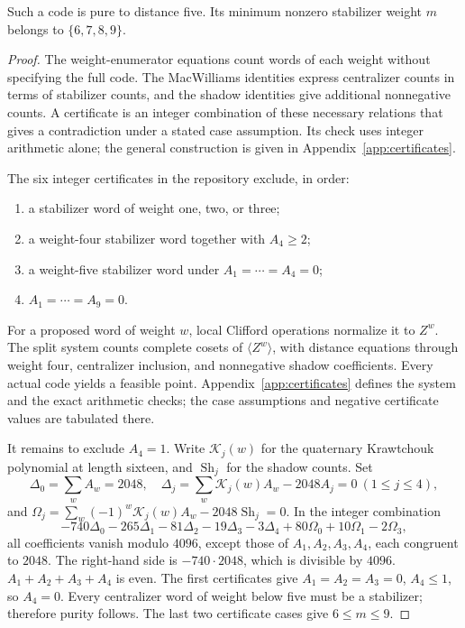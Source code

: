 \begin{proposition}\label{prop:16-reduction}
Such a code is pure to distance five. Its minimum nonzero stabilizer
weight \(m\) belongs to \(\{6,7,8,9\}\).
\end{proposition}
\begin{proof}
The weight-enumerator equations count words of each weight without
specifying the full code. The MacWilliams identities express centralizer
counts in terms of stabilizer counts, and the shadow identities give
additional nonnegative counts. A certificate is an integer combination
of these necessary relations that gives a contradiction under a stated
case assumption. Its check uses integer arithmetic alone; the general
construction is given in Appendix~\ref{app:certificates}.

The six integer certificates in the repository exclude, in order:
\begin{enumerate}[label=(\alph*)]
\item a stabilizer word of weight one, two, or three;
\item a weight-four stabilizer word together with \(A_4\geq2\);
\item a weight-five stabilizer word under \(A_1=\cdots=A_4=0\);
\item \(A_1=\cdots=A_9=0\).
\end{enumerate}
For a proposed word of weight \(w\), local Clifford operations normalize
it to \(Z^w\). The split system counts complete cosets of
\(\langle Z^w\rangle\), with distance equations through weight four,
centralizer inclusion, and nonnegative shadow coefficients. Every actual
code yields a feasible point. Appendix~\ref{app:certificates} defines
the system and the exact arithmetic checks; the case assumptions and
negative certificate values are tabulated there.

It remains to exclude \(A_4=1\). Write \(\mathcal{K}_j(w)\) for the quaternary
Krawtchouk polynomial at length sixteen, and \(\operatorname{Sh}_j\)
for the shadow counts. Set
\[
 \Delta_0=\sum_wA_w=2048,\quad
 \Delta_j=\sum_w\mathcal{K}_j(w)A_w-2048A_j=0\ (1\leq j\leq4),
\]
and \(\Omega_j=\sum_w(-1)^w\mathcal{K}_j(w)A_w-2048\operatorname{Sh}_j=0\).
In the integer combination
\[
 -740\Delta_0-265\Delta_1-81\Delta_2-19\Delta_3-3\Delta_4
       +80\Omega_0+10\Omega_1-2\Omega_3,
\]
all coefficients vanish modulo \(4096\), except those of
\(A_1,A_2,A_3,A_4\), each congruent to \(2048\).
The right-hand side is \(-740\cdot2048\), which is divisible by
\(4096\).
\(A_1+A_2+A_3+A_4\) is even. The first certificates give
\(A_1=A_2=A_3=0\), \(A_4\leq1\), so \(A_4=0\).
Every centralizer word of weight below five must be a stabilizer;
therefore purity follows. The last two certificate cases give
\(6\leq m\leq9\).
\end{proof}

